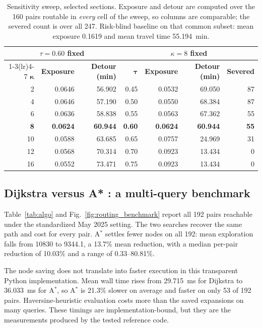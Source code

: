 \documentclass[10pt,twocolumn]{article}
\begin{document}
\begin{table}[!t]
\centering\footnotesize
\caption{Sensitivity sweep, selected sections. Exposure and detour are computed
over the 160 pairs routable in \emph{every} cell of the sweep, so columns are
comparable; the severed count is over all 247. Risk-blind baseline on that common
subset: mean exposure 0.1619 and mean travel time \SI{55.194}{\minute}.}
\label{tab:sensitivity}
\small
\begin{tabular}{@{}rrr@{\qquad\qquad}rrrr@{}}
\toprule
\multicolumn{3}{c}{\textbf{$\tau = 0.60$ fixed}} &
\multicolumn{4}{c}{\textbf{$\kappa = 8$ fixed}} \\
\cmidrule(lr){1-3}\cmidrule(lr){4-7}
$\boldsymbol{\kappa}$ & \textbf{Exposure} & \textbf{Detour (min)} &
$\boldsymbol{\tau}$ & \textbf{Exposure} & \textbf{Detour (min)} & \textbf{Severed} \\
\midrule
2  & 0.0646 & 56.902 & 0.45 & 0.0532 & 69.050 & 87 \\
4  & 0.0646 & 57.190 & 0.50 & 0.0550 & 68.384 & 87 \\
6  & 0.0636 & 58.838 & 0.55 & 0.0563 & 67.362 & 55 \\
\textbf{8}  & \textbf{0.0624} & \textbf{60.944} & \textbf{0.60} & \textbf{0.0624} & \textbf{60.944} & \textbf{55} \\
10 & 0.0588 & 63.685 & 0.65 & 0.0757 & 24.969 & 31 \\
12 & 0.0568 & 70.314 & 0.70 & 0.0923 & 13.434 & 0 \\
16 & 0.0552 & 73.471 & 0.75 & 0.0923 & 13.434 & 0 \\
\bottomrule
\end{tabular}
\end{table}

\subsection{Dijkstra versus A* : a multi-query benchmark}
\label{sec:res-algo}

Table~\ref{tab:algo} and Fig.~\ref{fig:routing_benchmark} report all 192 pairs
reachable under the standardized May 2025 setting. The two searches recover the
same path and cost for every pair. A$^\ast$ settles fewer nodes on all 192: mean
exploration falls from \num{10830} to \num{9344.1}, a 13.7\% mean reduction,
with a median per-pair reduction of 10.03\% and a range of 0.33--80.81\%.

The node saving does not translate into faster execution in this transparent
Python implementation. Mean wall time rises from \SI{29.715}{\milli\second} for
Dijkstra to \SI{36.033}{\milli\second} for A$^\ast$, so A$^\ast$ is 21.3\%
slower on average and faster on only 53 of 192 pairs. Haversine-heuristic
evaluation costs more than the saved expansions on many queries. These timings
are implementation-bound, but they are the measurements produced by the tested
reference code.
\end{document}
